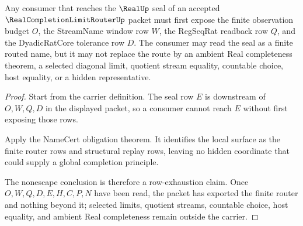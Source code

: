 \begin{theorem}
\label{thm:real-completion-limit-router-nonescape}
Any consumer that reaches the $\RealUp$ seal of an accepted $\RealCompletionLimitRouterUp$ packet must first expose the finite observation budget $O$, the StreamName window row $W$, the RegSeqRat readback row $Q$, and the DyadicRatCore tolerance row $D$. The consumer may read the seal as a finite routed name, but it may not replace the route by an ambient Real completeness theorem, a selected diagonal limit, quotient stream equality, countable choice, host equality, or a hidden representative.
\end{theorem}
\begin{proof}
Start from the carrier definition. The seal row $E$ is downstream of $O,W,Q,D$ in the displayed packet, so a consumer cannot reach $E$ without first exposing those rows.

Apply the NameCert obligation theorem. It identifies the local surface as the finite router rows and structural replay rows, leaving no hidden coordinate that could supply a global completion principle.

The nonescape conclusion is therefore a row-exhaustion claim. Once $O,W,Q,D,E,H,C,P,N$ have been read, the packet has exported the finite router and nothing beyond it; selected limits, quotient streams, countable choice, host equality, and ambient Real completeness remain outside the carrier.
\end{proof}


